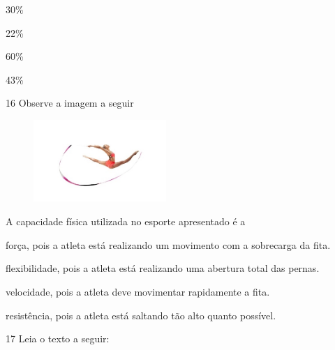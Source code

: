 \begin{escolha}

  \item 30\%

  \item 22\%

  \item 60\%

  \item 43\%

\end{escolha}

\num{16} Observe a imagem a seguir

\begin{figure}[htpb!]
\includegraphics[width=1.98053in,height=1.22549in]{./imgs/img5.jpg}
\end{figure}

A capacidade física utilizada no esporte apresentado é a

\begin{escolha}
\item força, pois a atleta está realizando um movimento com a sobrecarga da fita.

\item flexibilidade, pois a atleta está realizando uma abertura total das
pernas.

\item velocidade, pois a atleta deve movimentar rapidamente a fita.

\item resistência, pois a atleta está saltando tão alto quanto possível.
\end{escolha}


\num{17} Leia o texto a seguir:

